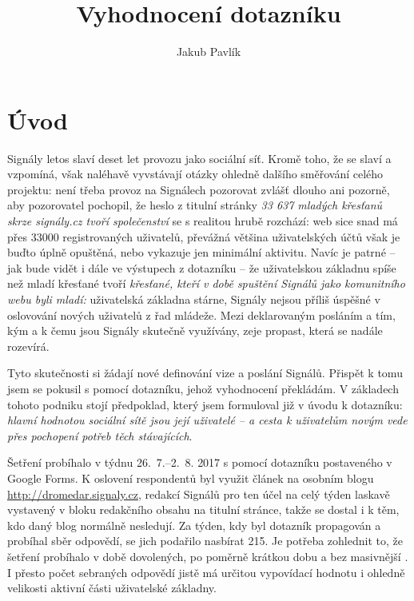 \documentclass[12pt, a4paper, twoside]{article}
\author{Jakub Pavlík}
\title{Vyhodnocení dotazníku\\ \uv{signaly.cz z pohledu uživatelů}}
\begin{document}
\setlength{\parindent}{0.5cm}

\maketitle

\section*{Úvod}

Signály letos slaví deset let provozu jako sociální síť.
Kromě toho, že se slaví a vzpomíná, však naléhavě vyvstávají otázky
ohledně dalšího směřování celého projektu:
není třeba provoz na Signálech pozorovat zvlášť dlouho ani pozorně,
aby pozorovatel pochopil, že heslo z titulní stránky
\emph{33 637 mladých křesťanů skrze signály.cz tvoří společenství}
se s realitou hrubě rozchází:
web sice snad má přes 33000 registrovaných
uživatelů, převážná většina uživatelských účtů však je buďto
úplně opuštěná, nebo vykazuje jen minimální aktivitu.
Navíc je patrné -- jak bude vidět i dále ve výstupech z dotazníku --
že uživatelskou základnu spíše než mladí křesťané
tvoří \emph{křesťané, kteří v době spuštění Signálů jako komunitního
  webu byli mladí:}
uživatelská základna stárne, Signály nejsou příliš úspěšné
v oslovování nových uživatelů z řad mládeže.
Mezi deklarovaným posláním a tím, kým a k čemu jsou Signály skutečně
využívány, zeje propast, která se nadále rozevírá.

Tyto skutečnosti si žádají nové definování vize a poslání Signálů.
Přispět k tomu jsem se pokusil s pomocí dotazníku, jehož vyhodnocení
překládám. V základech tohoto podniku stojí předpoklad,
který jsem formuloval již v úvodu k dotazníku:
\emph{hlavní hodnotou sociální sítě jsou její uživatelé --
  a cesta k uživatelům novým vede přes pochopení potřeb těch
  stávajících}.

Šetření probíhalo v týdnu 26.~7.--2.~8. 2017
s pomocí dotazníku postaveného v Google Forms.
K oslovení respondentů byl využit článek na osobním blogu
\url{http://dromedar.signaly.cz}, redakcí Signálů pro ten účel
na celý týden laskavě vystavený v bloku redakčního obsahu
na titulní stránce, takže se dostal i k těm, kdo daný blog normálně
nesledují.
Za týden, kdy byl dotazník propagován a probíhal sběr odpovědí,
se jich podařilo nasbírat 215. Je potřeba zohlednit to, že
šetření probíhalo v době dovolených, po poměrně krátkou dobu
a bez masivnější .
I přesto počet sebraných odpovědí jistě má určitou vypovídací
hodnotu i ohledně velikosti aktivní části uživatelské základny.
\end{document}
